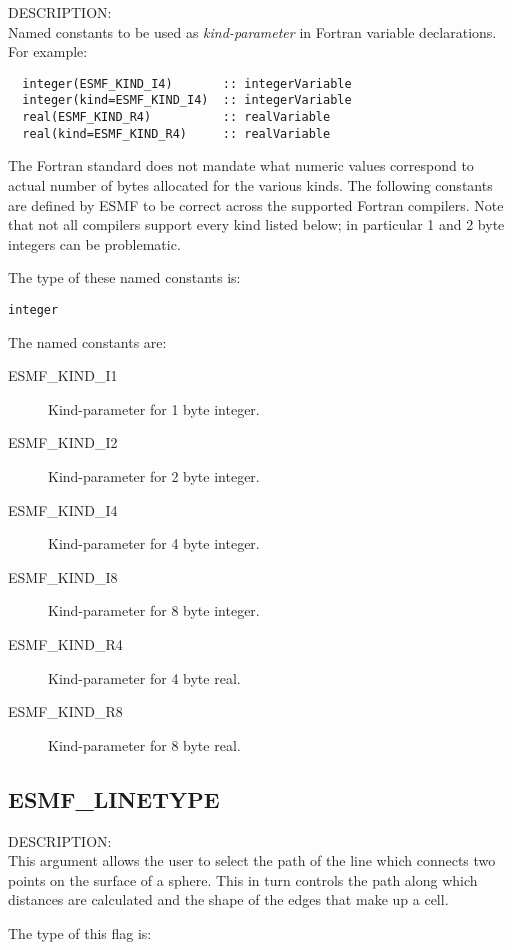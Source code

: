 {\sf DESCRIPTION:\\}
Named constants to be used as {\em kind-parameter} in Fortran variable
 declarations. For example:
\begin{verbatim}
  integer(ESMF_KIND_I4)       :: integerVariable
  integer(kind=ESMF_KIND_I4)  :: integerVariable
  real(ESMF_KIND_R4)          :: realVariable
  real(kind=ESMF_KIND_R4)     :: realVariable
\end{verbatim}
The Fortran standard does not mandate what numeric values correspond to
actual number of bytes allocated for the various kinds. The following constants
are defined by ESMF to be correct across the supported Fortran compilers.
Note that not all compilers support every kind listed below; in particular
1 and 2 byte integers can be problematic.

The type of these named constants is:

{\tt integer}

The named constants are:
\begin{description}
\item [ESMF\_KIND\_I1]
      Kind-parameter for 1 byte integer.
\item [ESMF\_KIND\_I2]
      Kind-parameter for 2 byte integer.
\item [ESMF\_KIND\_I4]
      Kind-parameter for 4 byte integer.
\item [ESMF\_KIND\_I8]
      Kind-parameter for 8 byte integer.
\item [ESMF\_KIND\_R4]
      Kind-parameter for 4 byte real.
\item [ESMF\_KIND\_R8]
      Kind-parameter for 8 byte real.
\end{description}


\subsection{ESMF\_LINETYPE}
\label{opt:lineType}

{\sf DESCRIPTION:\\}  This argument allows the user to select the path of the line which connects two points on the surface of a sphere.
This in turn controls the path along which distances are calculated and the shape of the edges that make up a cell. 

The type of this flag is:

